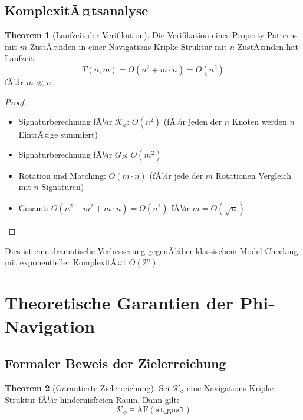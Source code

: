 ﻿\documentclass[a4paper,12pt]{article}
\theoremstyle{definition}
\newtheorem{theorem}{Theorem}[section]
\begin{document}
\subsection{KomplexitÃ¤tsanalyse}

\begin{theorem}[Laufzeit der Verifikation]
Die Verifikation eines Property Patterns mit $m$ ZustÃ¤nden in einer Navigations-Kripke-Struktur mit $n$ ZustÃ¤nden hat Laufzeit:
\[
T(n,m) = O(n^2 + m \cdot n) = O(n^2)
\]
fÃ¼r $m \ll n$.
\end{theorem}

\begin{proof}
\begin{itemize}
	\item Signaturberechnung fÃ¼r $\mathcal{K}_{\phi}$: $O(n^2)$ (fÃ¼r jeden der $n$ Knoten werden $n$ EintrÃ¤ge summiert)
	\item Signaturberechnung fÃ¼r $G_P$: $O(m^2)$
	\item Rotation und Matching: $O(m \cdot n)$ (fÃ¼r jede der $m$ Rotationen Vergleich mit $n$ Signaturen)
	\item Gesamt: $O(n^2 + m^2 + m \cdot n) = O(n^2)$ fÃ¼r $m = O(\sqrt{n})$
\end{itemize}
\end{proof}

Dies ist eine dramatische Verbesserung gegenÃ¼ber klassischem Model Checking mit exponentieller KomplexitÃ¤t $O(2^n)$.

\section{Theoretische Garantien der Phi-Navigation}

\subsection{Formaler Beweis der Zielerreichung}

\begin{theorem}[Garantierte Zielerreichung]
Sei $\mathcal{K}_{\phi}$ eine Navigations-Kripke-Struktur fÃ¼r hindernisfreien Raum. Dann gilt:
\[
\mathcal{K}_{\phi} \models \text{AF}(\texttt{at\_goal})
\]
\end{theorem}
\end{document}
